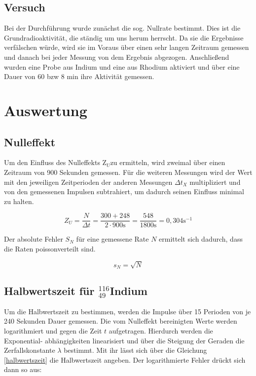 	\subsection{Versuch}
Bei der Durchführung wurde zunächst die sog. Nullrate bestimmt. Dies ist die Grundradioaktivität, die ständig um uns herum herrscht. Da sie die Ergebnisse verfälschen würde, wird sie im Voraus über einen sehr langen Zeitraum gemessen und danach bei jeder Messung von dem Ergebnis abgezogen.
Anschließend wurden eine Probe aus Indium und eine aus Rhodium aktiviert und über eine Dauer von 60 bzw 8 min ihre Aktivität gemessen.

\section{Auswertung}
\subsection{Nulleffekt}
Um den Einfluss des Nulleffekts Z$_U$zu ermitteln, wird zweimal über einen Zeitraum von 900 Sekunden gemessen. Für
die weiteren Messungen wird der Wert mit den jeweiligen Zeitperioden der anderen Messungen $\Delta t_X$ multipliziert und
von den gemessenen Impulsen subtrahiert, um dadurch seinen Einfluss minimal zu halten. 

\begin{equation}
 Z_U = \frac{N}{\Delta t} = \frac{300 + 248}{2 \cdot 900 \text{s}} = \frac{548}{1800 \text{s}} = 0,304 \text{s}^{-1}
\end{equation}

Der absolute Fehler $S_N$ für eine gemessene Rate $N$ ermittelt sich dadurch, dass die Raten poissonverteilt sind.

\begin{equation}
 s_N = \sqrt{N}
\end{equation}

\subsection{Halbwertszeit für $^{116}_{49}$Indium}
Um die Halbwertszeit zu bestimmen, werden die Impulse über 15 Perioden von je 240 Sekunden Dauer gemessen. Die vom
Nulleffekt bereinigten Werte werden logarithmiert und gegen die Zeit $t$ aufgetragen. Hierdurch werden die Exponential-
abhängigkeiten linearisiert und über die Steigung der Geraden die Zerfallskonstante $\lambda$ bestimmt. Mit ihr lässt sich
über die Gleichung \eqref{halbwertszeit} die Halbwertszeit angeben. Der logarithmierte Fehler drückt sich dann so aus:

